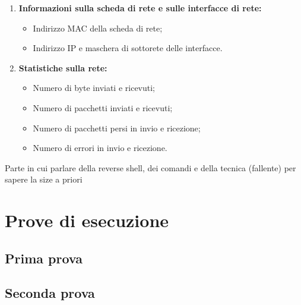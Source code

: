 \documentclass[a4paper]{report}
\begin{document}
\begin{enumerate}
	\item \textbf{Informazioni sulla scheda di rete e sulle interfacce di rete:}
	\begin{itemize}
		\item Indirizzo MAC della scheda di rete;
		\item Indirizzo IP e maschera di sottorete delle interfacce.
	\end{itemize}
	
	\item \textbf{Statistiche sulla rete:}
	\begin{itemize}
		\item Numero di byte inviati e ricevuti;
		\item Numero di pacchetti inviati e ricevuti;
		\item Numero di pacchetti persi in invio e ricezione;
		\item Numero di errori in invio e ricezione.
	\end{itemize}
	
\end{enumerate}

Parte in cui parlare della reverse shell, dei comandi e della tecnica (fallente) per sapere la size a priori 

\chapter{Prove di esecuzione}

\section{Prima prova}

\section{Seconda prova}
\end{document}
